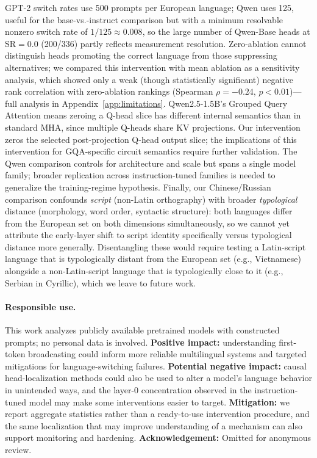 \documentclass[11pt]{article}
\begin{document}
GPT-2 switch rates use 500 prompts per European language; Qwen uses
125, useful for the base-vs.-instruct comparison but with a minimum
resolvable nonzero switch rate of $1/125\approx0.008$, so the large
number of Qwen-Base heads at SR$=$0.0 (200/336) partly reflects
measurement resolution. Zero-ablation cannot distinguish heads
promoting the correct language from those suppressing alternatives; we
compared this intervention with mean ablation as a sensitivity analysis, which
showed only a weak (though statistically significant) negative rank
correlation with zero-ablation rankings (Spearman
$\rho{=}{-}0.24$, $p{<}0.01$)---full analysis in
Appendix~\ref{app:limitations}.
Qwen2.5-1.5B's Grouped Query Attention means zeroing a Q-head slice has
different internal semantics than in standard MHA, since multiple Q-heads share
KV projections. Our intervention zeros the selected post-projection Q-head
output slice; the implications of this intervention for GQA-specific circuit
semantics require further validation. The Qwen comparison controls for
architecture and scale but spans a single model family; broader
replication across instruction-tuned families is needed to generalize
the training-regime hypothesis. Finally, our Chinese/Russian comparison
confounds \emph{script} (non-Latin orthography) with broader
\emph{typological} distance (morphology, word order, syntactic
structure): both languages differ from the European set on both
dimensions simultaneously, so we cannot yet attribute the early-layer
shift to script identity specifically versus typological distance more
generally. Disentangling these would require testing a Latin-script
language that is typologically distant from the European set (e.g.,
Vietnamese) alongside a non-Latin-script language that is typologically
close to it (e.g., Serbian in Cyrillic), which we leave to future work.

\paragraph{Responsible use.} This work analyzes publicly available pretrained
models with constructed prompts; no personal data is involved. \textbf{Positive
impact:} understanding first-token broadcasting could inform more reliable
multilingual systems and targeted mitigations for language-switching failures.
\textbf{Potential negative impact:} causal head-localization methods could
also be used to alter a model's language behavior in unintended ways, and the
layer-0 concentration observed in the instruction-tuned model may make some
interventions easier to target. \textbf{Mitigation:} we report aggregate
statistics rather than a ready-to-use intervention procedure, and the same
localization that may improve understanding of a mechanism can also support
monitoring and hardening. \textbf{Acknowledgement:}
Omitted for anonymous review.
\end{document}
